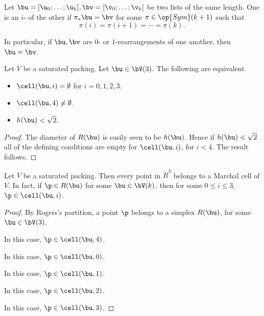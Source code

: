 \begin{definition}[$i$-rearrangement]
Let $\bu=[\u_0;\ldots;\u_k],\bv=[\v_0;\ldots;\v_k]$ be two lists of the same length.  
One is an
 $i$- of the other if
$\pi_*\bu = \bv$ for some $\pi\in\op{Sym}(k+1)$ such
that 
\begin{displaymath}
\pi(i) = \pi(i+1)=\cdots=\pi(k).
\end{displaymath}
\end{definition}

In particular, if $\bu,\bv$ are $0$- or $1$-rearrangements of one another,
then $\bu = \bv$.


\begin{lemma}\label{lemma:M-complement4}
Let $V$ be a saturated packing.  Let $\bu\in \bV(3)$.
The following are equivalent.
\begin{itemize}
\item  $\cell(\bu,i)=\emptyset$ for $i=0,1,2,3$.
\item  $\cell(\bu,4)\ne\emptyset$.
\item  $h(\bu)<\sqrt2$.
\end{itemize}
\end{lemma}

\begin{proof}
The diameter of $R(\bu)$ is easily seen to be $h(\bu)$.  Hence if $h(\bu)<\sqrt2$
all of the defining conditions are empty for $\cell(\bu,i)$, for $i<4$.  The result follows.
\end{proof}

\begin{lemma} \label{lemma:M-exhaust}
Let $V$ be a saturated packing.  Then every point in $\ring{R}^3$ belongs to
a Marchal cell of $V$.  In fact, if $\p\in R(\bu)$ for some $\bu\in \bV(k)$, 
then for some $0\le i\le 3$, $\p\in \cell(\bu,i)$.
\end{lemma}

\begin{proof}
By Rogers's partition, a point $\p$ belongs to a simplex
$R(\bu)$, for some $\bu\in\bV(3)$.  

\noindent
{} In this case,  $\p\in\cell(\bu,4)$.

\noindent
{} In this case, $\p\in\cell(\bu,0)$.

\noindent
{} 
In this case, $\p\in \cell(\bu,1)$.

\noindent
{} In this
case, $\p\in \cell(\bu,2)$.

\noindent
{} In this
case, $\p\in \cell(\bu,3)$.
\end{proof}




